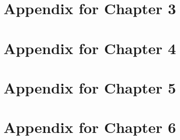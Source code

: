 
\chapter{Appendix for Chapter 3}
\label{app:chapter3}


\chapter{Appendix for Chapter 4}
\label{app:chapter4}


\chapter{Appendix for Chapter 5}
\label{app:chapter5}


\chapter{Appendix for Chapter 6}
\label{app:chapter6}

